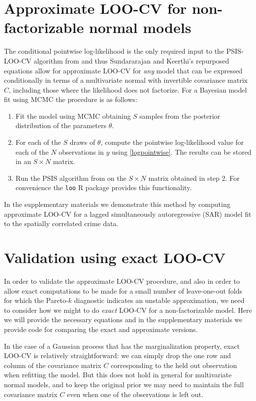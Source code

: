 \documentclass[11pt]{article}
\begin{document}
\section{Approximate LOO-CV for non-factorizable normal models}
\label{sec-approx}

The conditional pointwise log-likelihood is the only required input to the
PSIS-LOO-CV algorithm from \cite{vehtari2017loo} and thus Sundararajan and
Keerthi's repurposed equations allow for approximate LOO-CV for \emph{any} model
that can be expressed conditionally in terms of a multivariate normal with
invertible covariance matrix $C$, including those where the likelihood does not
factorize. For a Bayesian model fit using MCMC the procedure is as follows:

\begin{enumerate}
\item Fit the model using MCMC obtaining $S$ samples from the posterior
distribution of the parameters $\theta$.
\item For each of the $S$ draws of $\theta$, compute the pointwise
log-likelihood value for each of the $N$ observations in $y$ using
\eqref{logpointwise}. The results can be stored in an $S \times N$ matrix.
\item Run the PSIS algorithm from \cite{vehtari2017loo} on the $S \times N$
matrix obtained in step 2. For convenience the \texttt{loo} R package
\citep{loo2018} provides this functionality.
\end{enumerate}

In the supplementary materials we demonstrate this method by computing
approximate LOO-CV for a lagged simultaneously autoregressive (SAR) model fit to
the spatially correlated crime data.

\section{Validation using exact LOO-CV}

In order to validate the approximate LOO-CV procedure, and also in order to
allow exact computations to be made for a small number of leave-one-out folds
for which the Pareto-$k$ diagnostic \citep{vehtari2017psis} indicates an
unstable approximation, we need to consider how we might to do \emph{exact}
LOO-CV for a non-factorizable model. Here we will provide the necessary
equations and in the supplementary materials we provide code for comparing the
exact and approximate versions.

In the case of a Gaussian process that has the marginalization property, exact
LOO-CV is relatively straightforward: we can simply drop the one row and column
of the covariance matrix $C$ corresponding to the held out observation when
refitting the model. But this does not hold in general for multivariate normal
models, and to keep the original prior we may need to maintain the full
covariance matrix $C$ even when one of the observations is left out.
\end{document}
